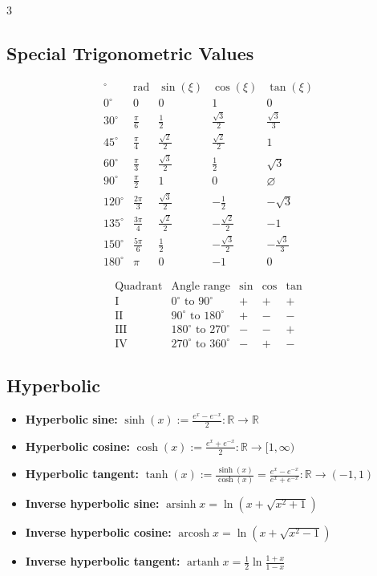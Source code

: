 \begin{multicols*}{3}
\subsection*{Special Trigonometric Values}
\[
\begin{array}{c|c|c|c|c}
^\circ & \mathrm{rad} & \sin(\xi) & \cos(\xi) & \tan(\xi)\\
\hline
0^\circ & 0 & 0 & 1 & 0\\
30^\circ & \frac{\pi}{6} & \frac12 & \frac{\sqrt3}{2} & \frac{\sqrt3}{3}\\
45^\circ & \frac{\pi}{4} & \frac{\sqrt2}{2} & \frac{\sqrt2}{2} & 1\\
60^\circ & \frac{\pi}{3} & \frac{\sqrt3}{2} & \frac12 & \sqrt3\\
90^\circ & \frac{\pi}{2} & 1 & 0 & \varnothing\\
120^\circ & \frac{2\pi}{3} & \frac{\sqrt3}{2} & -\frac12 & -\sqrt3\\
135^\circ & \frac{3\pi}{4} & \frac{\sqrt2}{2} & -\frac{\sqrt2}{2} & -1\\
150^\circ & \frac{5\pi}{6} & \frac12 & -\frac{\sqrt3}{2} & -\frac{\sqrt3}{3}\\
180^\circ & \pi & 0 & -1 & 0
\end{array}
\]

\[
\begin{array}{c|c|c|c|c}
\text{Quadrant} & \text{Angle range} & \sin & \cos & \tan \\
\hline
\text{I} & 0^\circ \text{ to } 90^\circ & + & + & + \\
\text{II} & 90^\circ \text{ to } 180^\circ & + & - & - \\
\text{III} & 180^\circ \text{ to } 270^\circ & - & - & + \\
\text{IV} & 270^\circ \text{ to } 360^\circ & - & + & -
\end{array}
\]

\subsection*{Hyperbolic}
\begin{itemize}[noitemsep, topsep=0pt, leftmargin=*]
\item \textbf{Hyperbolic sine:} $\sinh(x):=\frac{e^x-e^{-x}}{2}:\mathbb{R}\to\mathbb{R}$
\item \textbf{Hyperbolic cosine:} $\cosh(x):=\frac{e^x+e^{-x}}{2}:\mathbb{R}\to[1,\infty)$
\item \textbf{Hyperbolic tangent:} $\tanh(x):=\frac{\sinh(x)}{\cosh(x)}=\frac{e^x-e^{-x}}{e^x+e^{-x}}:\mathbb{R}\to(-1,1)$
\item \textbf{Inverse hyperbolic sine:} $\operatorname{arsinh}x=\ln(x+\sqrt{x^2+1})$
\item \textbf{Inverse hyperbolic cosine:} $\operatorname{arcosh}x=\ln(x+\sqrt{x^2-1})$
\item \textbf{Inverse hyperbolic tangent:} $\operatorname{artanh}x=\frac12\ln\frac{1+x}{1-x}$
\end{itemize}


\end{multicols*}
